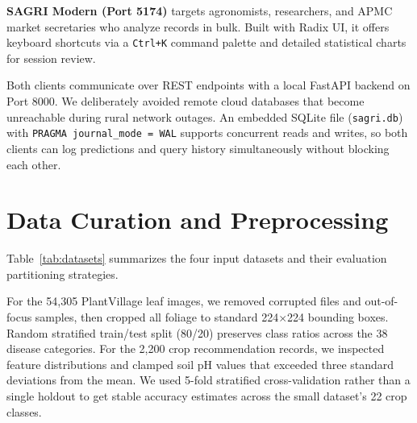 \documentclass[conference]{IEEEtran}
\begin{document}
\textbf{SAGRI Modern (Port 5174)} targets agronomists, researchers, and APMC market secretaries who analyze records in bulk. Built with Radix UI, it offers keyboard shortcuts via a \texttt{Ctrl+K} command palette and detailed statistical charts for session review.

Both clients communicate over REST endpoints with a local FastAPI backend on Port 8000. We deliberately avoided remote cloud databases that become unreachable during rural network outages. An embedded SQLite file (\texttt{sagri.db}) with \texttt{PRAGMA journal\_mode = WAL} supports concurrent reads and writes, so both clients can log predictions and query history simultaneously without blocking each other.

\section{Data Curation and Preprocessing}
Table~\ref{tab:datasets} summarizes the four input datasets and their evaluation partitioning strategies.

\begin{table}[htbp]
\caption{Dataset Summary and Partitioning Strategy}
\label{tab:datasets}
\centering
{}
\end{table}

For the 54,305 PlantVillage leaf images, we removed corrupted files and out-of-focus samples, then cropped all foliage to standard 224$\times$224 bounding boxes. Random stratified train/test split (80/20) preserves class ratios across the 38 disease categories. For the 2,200 crop recommendation records, we inspected feature distributions and clamped soil pH values that exceeded three standard deviations from the mean. We used 5-fold stratified cross-validation rather than a single holdout to get stable accuracy estimates across the small dataset's 22 crop classes.
\end{document}
